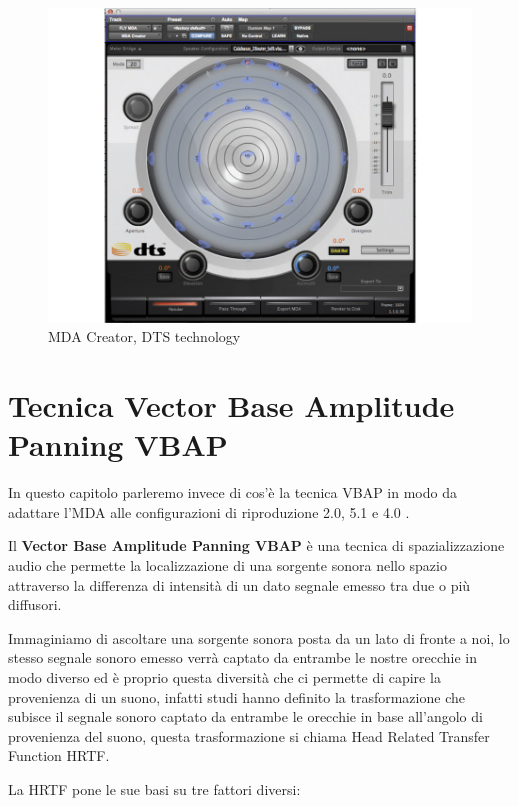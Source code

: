 \documentclass[12pt,a4paper]{report}
\begin{document}
\begin{figure}[htbp]
	\centering
	\includegraphics[scale=0.50]{figures/mdacreator.jpg}
	\caption {MDA Creator, DTS technology}
	\label{fig:mdacreator}
	\end{figure}

\chapter{Tecnica Vector Base Amplitude Panning VBAP}

In questo capitolo parleremo invece di cos'è la tecnica VBAP in modo da adattare l'MDA alle configurazioni di riproduzione 2.0, 5.1 e 4.0 .

Il \textbf{Vector Base Amplitude Panning VBAP} è una tecnica di spazializzazione audio che permette la localizzazione di  una sorgente sonora nello spazio attraverso la differenza di intensità di un dato segnale emesso tra due o più diffusori.

Immaginiamo di ascoltare una sorgente sonora posta da un lato di fronte a noi, lo stesso segnale sonoro emesso verrà captato da entrambe le nostre orecchie in modo diverso ed è proprio questa diversità che ci permette di capire la provenienza di un suono, infatti studi hanno definito la trasformazione che subisce il segnale sonoro captato da entrambe le orecchie in base all'angolo di provenienza del suono, questa trasformazione si chiama Head Related Transfer Function HRTF.

La HRTF pone le sue basi su tre fattori diversi:
\end{document}
